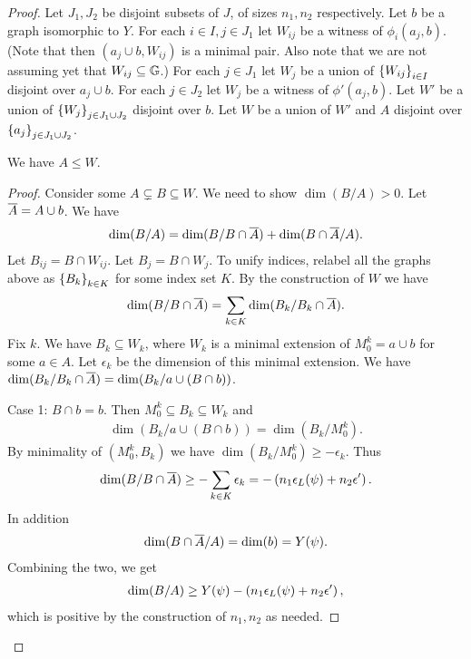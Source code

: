 \begin{proof}
  Let $J_1, J_2$ be disjoint subsets of $J$, of sizes $n_1, n_2$ respectively.
  Let $b$ be a graph isomorphic to $Y$.
  For each $i \in I, j \in J_1$ let $W_{ij}$ be a witness of $\phi_i(a_j, b)$.
  (Note that then $(a_j \cup b, W_{ij})$ is a minimal pair. Also note that we are not assuming yet that $W_{ij} \subseteq \mathbb G$.)
  For each $j \in J_1$ let $W_j$ be a union of $\left\{W_{ij}\right\}_{i \in I}$ disjoint over $a_j \cup b$.
  For each $j \in J_2$ let $W_{j}$ be a witness of $\phi'(a_j, b)$.
  Let $W'$ be a union of $\left\{W_j\right\}_{j \in J_1 \cup J_2}$ disjoint over $b$.
  Let $W$ be a union of $W'$ and $A$ disjoint over $\left\{a_j\right\}_{j \in J_1 \cup J_2}$.
  \begin{Lemma} \label{ALEQW}
    We have $A \leq W$.
  \end{Lemma}
  \begin{proof}
    Consider some $A \subsetneq B \subseteq W$.
    We need to show $\dim (B/A) > 0$.
    Let $\overline{A} = A \cup b$.
    We have
    \begin{align*}
      \dim(B/A) = \dim(B/ B \cap \overline{A}) + \dim(B \cap \overline{A} / A).
    \end{align*}
    Let $B_{ij} = B \cap W_{ij}$.
    Let $B_{j} = B \cap W_{j}$.
    To unify indices, relabel all the graphs above as $\left\{B_k\right\}_{k \in K}$ for some index set $K$.
    By the construction of $W$ we have
    \begin{align*}
      \dim(B/ B \cap \overline{A}) = \sum_{k \in K} \dim(B_k/ B_k \cap \overline{A}).
    \end{align*}
    Fix $k$.
    We have $B_k \subseteq W_k$, where $W_k$ is a minimal extension of $M^k_0 = a \cup b$ for some $a \in A$.
    Let $\epsilon_k$ be the dimension of this minimal extension.
    We have $\dim(B_k / B_k \cap \overline{A}) = \dim(B_k / a \cup (B \cap b))$.

    Case 1: $B \cap b = b$.
    Then $M_0^k \subseteq B_k \subseteq W_k$ and
    \begin{align*}
      \dim(B_k / a \cup (B \cap b)) = \dim (B_k/M_0^k).
    \end{align*}
    By minimality of $(M_0^k, B_k)$ we have $\dim (B_k/M_0^k) \geq -\epsilon_k$.
    Thus
    \begin{align*}
      \dim(B/ B \cap \overline{A}) \geq - \sum_{k \in K} \epsilon_k = -\left(n_1 \epsilon_L(\psi) + n_2 \epsilon'\right).
    \end{align*}
    In addition
    \begin{align*}
      \dim(B \cap \overline{A} / A) = \dim (b) = Y(\psi).
    \end{align*}
    Combining the two, we get
    \begin{align*}
      \dim(B/A) \geq Y(\psi) - \left(n_1 \epsilon_L(\psi) + n_2 \epsilon'\right),
    \end{align*}
    which is positive by the construction of $n_1, n_2$ as needed.
    

\end{proof}
\end{proof}
